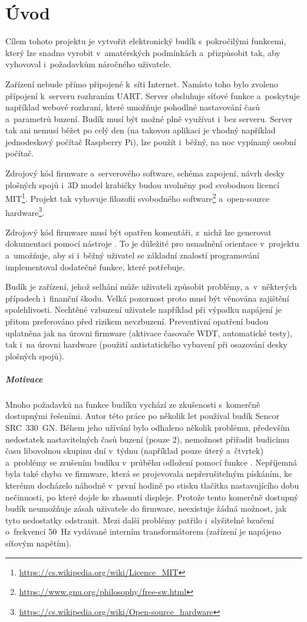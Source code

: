 \chapter{Úvod}
Cílem tohoto projektu je vytvořit elektronický budík s~pokročilými funkcemi,
který lze snadno vyrobit v~amatérských podmínkách a~přizpůsobit tak, aby
vyhovoval i~požadavkům náročného uživatele.

Zařízení nebude přímo připojené k~síti Internet. Namísto toho bylo zvoleno
přípojení k~serveru rozhraním UART. Server obsluhuje síťové funkce a~poskytuje
například webové rozhraní, které umožňuje pohodlné nastavování časů a~parametrů
buzení. Budík musí být možné plně využívat i~bez serveru. Server tak ani nemusí
běžet po celý den (na takovou aplikaci je vhodný například jednodeskový počítač
Raspberry Pi), lze použít i~běžný, na noc vypínaný osobní počítač.


Zdrojový kód firmware a~serverového software, schéma zapojení, návrh desky
plošných spojů i~3D model krabičky budou uvolněny pod svobodnou
licencí MIT\footnote{\url{https://cs.wikipedia.org/wiki/Licence_MIT}}.
Projekt tak vyhovuje filozofii svobodného
software\footnote{\url{https://www.gnu.org/philosophy/free-sw.html}}
a~open-source
hardware\footnote{\url{https://cs.wikipedia.org/wiki/Open-source_hardware}}.

Zdrojový kód firmware musí být opatřen komentáři, z~nichž lze generovat
dokumentaci pomocí nástroje . To je důležité pro usnadnění
orientace v~projektu a~umožňuje, aby si i~běžný uživatel se základní znalostí
programování implementoval dodatečné funkce, které potřebuje.

Budík je zařízení, jehož selhání může uživateli způsobit problémy,
a~v~některých případech i~finanční škodu. Velká pozornost proto musí být
věnována zajištění spolehlivosti. Nechtěné vzbuzení uživatele například při
výpadku napájení je přitom preferováno před rizikem nevzbuzení. Preventivní
opatření budou uplatněna jak na úrovni firmware (aktivace časovače \acs{WDT},
automatické testy), tak i~na úrovni hardware (použití antistatického vybavení
při osazování desky plošných spojů).

\paragraph{Motivace}
Mnoho požadavků na funkce budíku vychází ze zkušenosti s~komerčně dostupnými
řešeními. Autor této práce po několik let používal budík Sencor SRC~330~GN.
Během jeho užívání bylo odhaleno několik problému, především nedostatek
nastavitelných časů buzení (pouze 2), nemožnost přiřadit budicímu času
libovolnou skupinu dní v~týdnu (například pouze úterý a~čtvrtek) a~problémy se
zrušením budíku v~průběhu odložení pomocí funkce . Nepříjemná byla
také chyba ve firmware, která se projevovala nepřerušitelným pískáním, ke
kterému docházelo náhodně v~první hodině po stisku tlačítka nastavujícího dobu
nečinnosti, po které dojde ke zhasnutí displeje. Protože tento komerčně
dostupný budík neumožňuje zásah uživatele do firmware, neexistuje žádná
možnost, jak tyto nedostatky odstranit. Mezi další problémy patřilo
i~slyšitelné bzučení o~frekvenci \SI{50}{\hertz} vydávané interním
transformátorem (zařízení je napájeno síťovým napětím).

